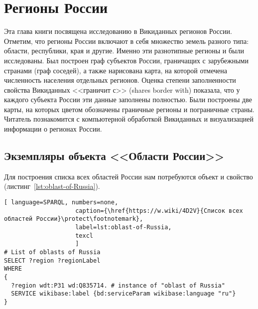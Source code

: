 ﻿\chapter{Регионы России}
\label{ch:oblast-of-Russia}
Эта глава книги посвящена исследованию в Викиданных регионов России. 
Отметим, что регионы России включают в себя множество земель разного 
типа: области, республики, края и другие. Именно эти разнотипные регионы 
и были исследованы. Был построен граф субъектов России, граничащих 
с зарубежными странами (граф соседей), а также нарисована карта, 
на которой отмечена численность населения отдельных регионов. Оценка 
степени заполненности свойства Викиданных <<граничит с>> (shares border with) 
показала, что у каждого субъекта России эти данные заполнены полностью. Были построены две карты, на которых цветом обозначены граничные регионы и пограничные страны.
Читатель познакомится с компьютерной обработкой Викиданных и визуализацией 
информации о регионах России.

\label{question:q_subjects_of_Russia_3}

\section{Экземпляры объекта <<Области России>>}

Для построения списка всех областей России нам потребуются объект 
 и свойство  
(листинг~\ref{lst:oblast-of-Russia}).

\begin{lstlisting}[ language=SPARQL, numbers=none,
                    caption={\href{https://w.wiki/4D2V}{Список всех областей России}\protect\footnotemark},
                    label=lst:oblast-of-Russia,
                    texcl 
                    ]
# List of oblasts of Russia
SELECT ?region ?regionLabel
WHERE
{
  ?region wdt:P31 wd:Q835714. # instance of "oblast of Russia"
  SERVICE wikibase:label {bd:serviceParam wikibase:language "ru"}
}
\end{lstlisting}%

